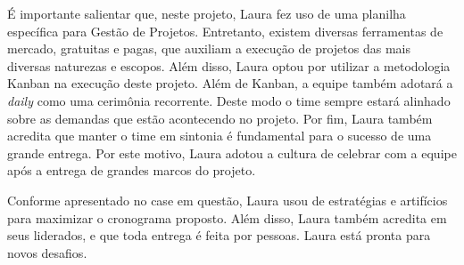 É importante salientar que, neste projeto, Laura fez uso de uma planilha específica para Gestão de Projetos. Entretanto, existem diversas ferramentas de mercado, gratuitas e pagas, que auxiliam a execução de projetos das mais diversas naturezas e escopos. Além disso, Laura optou por utilizar a metodologia Kanban \cite{arbulu2003kanban} na execução deste projeto. Além de Kanban, a equipe também adotará a \textit{daily} como uma cerimônia recorrente. Deste modo o time sempre estará alinhado sobre as demandas que estão acontecendo no projeto. Por fim, Laura também acredita que manter o time em sintonia é fundamental para o sucesso de uma grande entrega. Por este motivo, Laura adotou a cultura de celebrar com a equipe após a entrega de grandes marcos do projeto.

Conforme apresentado no case em questão, Laura usou de estratégias e artifícios para maximizar o cronograma proposto. Além disso, Laura também acredita em seus liderados, e que toda entrega é feita por pessoas. Laura está pronta para novos desafios.
% 